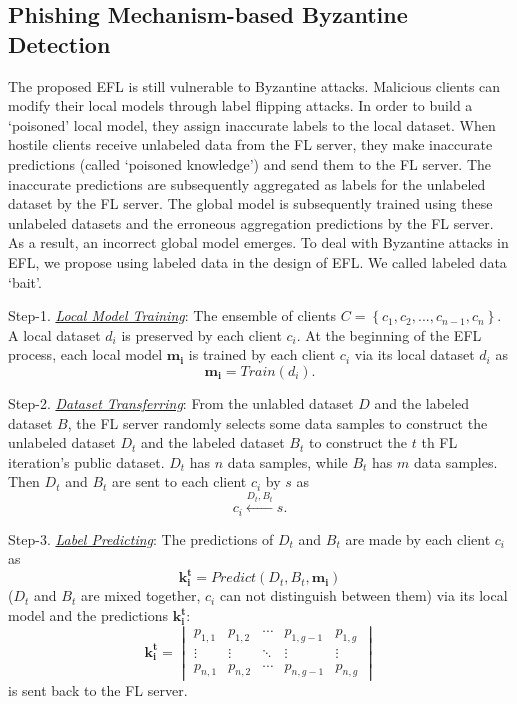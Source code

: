 \documentclass[journal]{IEEEtran}
\begin{document}
\subsection{Phishing Mechanism-based Byzantine Detection}
The proposed EFL is still vulnerable to Byzantine attacks. Malicious clients can modify their local models through label flipping attacks. In order to build a `poisoned' local model, they assign inaccurate labels to the local dataset. When hostile clients receive unlabeled data from the FL server, they make inaccurate predictions (called `poisoned knowledge') and send them to the FL server. The inaccurate predictions are subsequently aggregated as labels for the unlabeled dataset by the FL server. The global model is subsequently trained using these unlabeled datasets and the erroneous aggregation predictions by the FL server. As a result, an incorrect global model emerges. To deal with Byzantine attacks in EFL, we propose using labeled data in the design of EFL. We called labeled data `bait'.

\par Step-1. \ul{\textit{Local Model Training}}: The ensemble of clients $C=\left \{ c_{1},c_{2},...,c_{n-1},c_{n} \right \}$. A local dataset $d_i$ is preserved by each client $c_i$. At the beginning of the EFL process, each local model $\mathbf{m_i}$ is trained by each client $c_i$ via its local dataset $d_i$ as
\begin{equation}
  \mathbf{m_i}=Train(d_i).
\end{equation}
\par Step-2. \ul{\textit{Dataset Transferring}}: From the unlabled dataset $D$ and the labeled dataset $B$, the FL server randomly selects some data samples to construct the unlabeled dataset $D_t$ and the labeled dataset $B_t$ to construct the $t$ th FL iteration's public dataset. $D_t$ has $n$ data samples, while $B_t$ has $m$ data samples. Then $D_t$ and $B_t$ are sent to each client $c_i$ by $s$ as
\begin{equation}
  c_{i} \overset{{D_{t},B_{t}}}{\leftarrow}s.
\end{equation}
\par Step-3. \ul{\textit{Label Predicting}}: The predictions of $D_t$ and $B_t$ are made by each client $c_i$ as
\begin{equation}
  \mathbf{k_i^t}=Predict(D_t, B_t, \mathbf{m_i})
\end{equation}
($D_t$ and $B_t$ are mixed together, $c_i$ can not distinguish between them) via its local model and the predictions $\mathbf{k_i^t}$:
\begin{equation}
  \mathbf{k_i^t}=\begin{vmatrix}
    p_{1,1} & p_{1,2} & \cdots  & p_{1,g-1} & p_{1,g}\\ 
    \vdots  & \vdots & \ddots  & \vdots & \vdots\\ 
    p_{n,1} & p_{n,2} & \cdots  & p_{n,g-1} & p_{n,g}
    \end{vmatrix}
\end{equation}
is sent back to the FL server.
\end{document}
